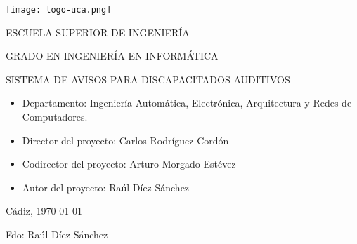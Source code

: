 \begin{center}

  \texttt{[image: logo-uca.png]} \\

  \vspace{2.0cm}

  \Large{ESCUELA SUPERIOR DE INGENIERÍA} \\

  \vspace{1.0cm}

  \large{GRADO EN INGENIERÍA EN INFORMÁTICA} \\

  \vspace{1.5cm}

  \huge{SISTEMA DE AVISOS PARA DISCAPACITADOS AUDITIVOS} \\

  \vspace{2.0cm}

\end{center}

\begin{itemize}
\item \large{Departamento: Ingeniería Automática, Electrónica, Arquitectura y Redes de Computadores.}
\item \large{Director del proyecto: Carlos Rodríguez Cordón}
\item \large{Codirector del proyecto: Arturo Morgado Estévez}
\item \large{Autor del proyecto: Raúl Díez Sánchez}
\end{itemize}

\vspace{0.2cm}

\begin{flushright}
  \large{Cádiz, \today} \\

  \vspace{1.5cm}

  \large{Fdo: Raúl Díez Sánchez}
\end{flushright}

